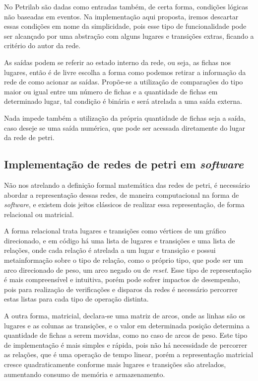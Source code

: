No Petrilab são dadas como entradas também, de certa forma, condições lógicas não baseadas em eventos. Na implementação aqui proposta, iremos descartar essas condições em nome da simplicidade, pois esse tipo de funcionalidade pode ser alcançado por uma abstração com alguns lugares e transições extras, ficando a critério do autor da rede.

As saídas podem se referir ao estado interno da rede, ou seja, as fichas nos lugares, então é de livre escolha a forma como podemos retirar a informação da rede de como acionar as saídas. Propõe-se a utilização de comparações do tipo maior ou igual entre um número de fichas e a quantidade de fichas em determinado lugar, tal condição é binária e será atrelada a uma saída externa.

Nada impede também a utilização da própria quantidade de fichas seja a saída, caso deseje se uma saída numérica, que pode ser acessada diretamente do lugar da rede de petri.

\subsection{Implementação de redes de petri em \textit{software}}

Não nos atrelando a definição formal matemática das redes de petri, é necessário abordar a representação dessas redes, de maneira computacional na forma de \textit{software}, e existem dois jeitos clássicos de realizar essa representação, de forma relacional ou matricial.

A forma relacional trata lugares e transições como vértices de um gráfico direcionado, e em código há uma lista de lugares e transições e uma lista de relações, onde cada relação é atrelada a um lugar e transição e possui metainformação sobre o tipo de relação, como o próprio tipo, que pode ser um arco direcionado de peso, um arco negado ou de \textit{reset}. Esse tipo de representação é mais compreensível e intuitiva, porém pode sofrer impactos de desempenho, pois para realização de verificações e disparos da redes é necessário percorrer estas listas para cada tipo de operação distinta.

A outra forma, matricial, declara-se uma matriz de arcos, onde as linhas são os lugares e as colunas as transições, e o valor em determinada posição determina a quantidade de fichas a serem movidas, como no caso de arcos de peso. Este tipo de implementação é mais simples e rápida, pois não há necessidade de percorrer as relações, que é uma operação de tempo linear, porém a representação matricial cresce quadraticamente conforme mais lugares e transições são atrelados, aumentando consumo de memória e armazenamento. 

